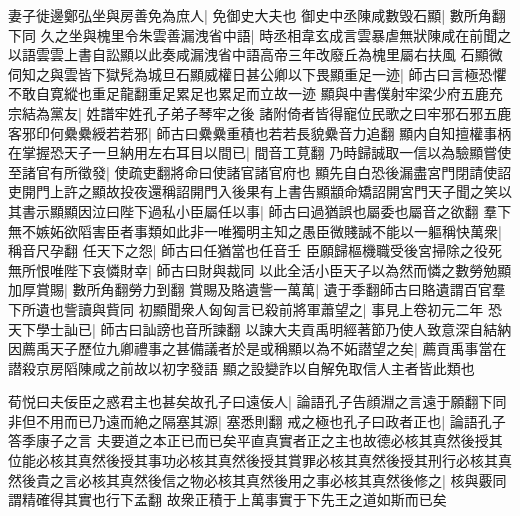 妻子徙邊鄭弘坐與房善免為庶人|{
	免御史大夫也}
御史中丞陳咸數毁石顯|{
	數所角翻下同}
久之坐與槐里令朱雲善漏洩省中語|{
	時丞相韋玄成言雲暴虐無狀陳咸在前聞之以語雲雲上書自訟顯以此奏咸漏洩省中語高帝三年改廢丘為槐里屬右扶風}
石顯微伺知之與雲皆下獄髠為城旦石顯威權日甚公卿以下畏顯重足一迹|{
	師古曰言極恐懼不敢自寛縱也重足龍翻重足累足也累足而立故一迹}
顯與中書僕射牢梁少府五鹿充宗結為黨友|{
	姓譜牢姓孔子弟子琴牢之後}
諸附倚者皆得寵位民歌之曰牢邪石邪五鹿客邪印何纍纍綬若若邪|{
	師古曰纍纍重積也若若長貌纍音力追翻}
顯内自知擅權事柄在掌握恐天子一旦納用左右耳目以間已|{
	間音工莧翻}
乃時歸誠取一信以為驗顯嘗使至諸官有所徵發|{
	使疏吏翻將命曰使諸官諸官府也}
顯先自白恐後漏盡宮門閉請使詔吏開門上許之顯故投夜還稱詔開門入後果有上書告顯顓命矯詔開宮門天子聞之笑以其書示顯顯因泣曰陛下過私小臣屬任以事|{
	師古曰過猶誤也屬委也屬音之欲翻}
羣下無不嫉妬欲䧟害臣者事類如此非一唯獨明主知之愚臣微賤誠不能以一軀稱快萬衆|{
	稱音尺孕翻}
任天下之怨|{
	師古曰任猶當也任音壬}
臣願歸樞機職受後宮掃除之役死無所恨唯陛下哀憐財幸|{
	師古曰財與裁同}
以此全活小臣天子以為然而憐之數勞勉顯加厚賞賜|{
	數所角翻勞力到翻}
賞賜及賂遺訾一萬萬|{
	遺于季翻師古曰賂遺謂百官羣下所遺也訾讀與貲同}
初顯聞衆人匈匈言已殺前將軍蕭望之|{
	事見上卷初元二年}
恐天下學士訕已|{
	師古曰訕謗也音所諫翻}
以諫大夫貢禹明經著節乃使人致意深自結納因薦禹天子歷位九卿禮事之甚備議者於是或稱顯以為不妬譛望之矣|{
	薦貢禹事當在譛殺京房䧟陳咸之前故以初字發語}
顯之設變詐以自解免取信人主者皆此類也

荀悦曰夫佞臣之惑君主也甚矣故孔子曰遠佞人|{
	論語孔子告顔淵之言遠于願翻下同}
非但不用而已乃遠而絶之隔塞其源|{
	塞悉則翻}
戒之極也孔子曰政者正也|{
	論語孔子答季康子之言}
夫要道之本正已而已矣平直真實者正之主也故德必核其真然後授其位能必核其真然後授其事功必核其真然後授其賞罪必核其真然後授其刑行必核其真然後貴之言必核其真然後信之物必核其真然後用之事必核其真然後修之|{
	核與覈同謂精確得其實也行下孟翻}
故衆正積于上萬事實于下先王之道如斯而已矣

